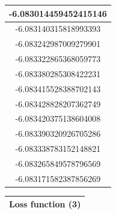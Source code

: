\documentclass[a4paper]{article}
\begin{document}
\begin{table}[H]
\begin{multicols}{3}
\begin{tabular}{|c|}
-6.083014459452415146 \\ \hline
-6.083140315818993393 \\ \hline
-6.083242987009279901 \\ \hline
-6.083322865368059773 \\ \hline
-6.083380285308422231 \\ \hline
-6.083415528388702143 \\ \hline
-6.083428828207362749 \\ \hline
-6.083420375138604008 \\ \hline
-6.083390320926705286 \\ \hline
-6.083338783152148821 \\ \hline
-6.083265849578796569 \\ \hline
-6.083171582387856269 \\ \hline
\end{tabular}

\columnbreak

\begin{tabular}{|c|}%
\hline
\bfseries Loss function (3) \\%
\hline


\end{tabular}
\end{multicols}
\end{table}
\end{document}
